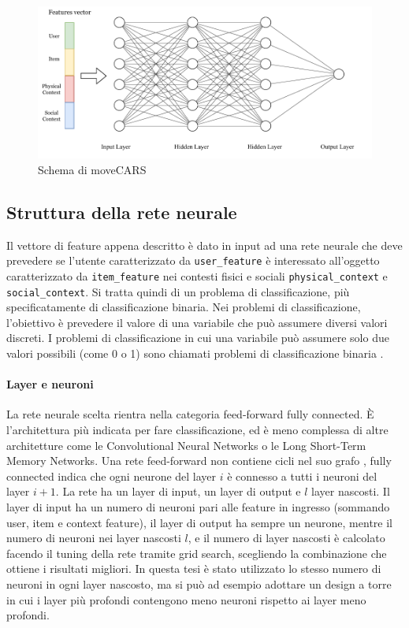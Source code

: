 \documentclass[12pt,italian]{report}
\begin{document}
\begin{figure}
  \includegraphics[width=\linewidth]{immagini/ffnet_schema.pdf}
  \caption{Schema di moveCARS}
  \label{fig:ffnet}
\end{figure}

\subsection{Struttura della rete neurale}
Il vettore di feature appena descritto è dato in input ad una rete neurale che deve prevedere se l'utente caratterizzato da \texttt{user\_feature} è interessato all'oggetto caratterizzato da \texttt{item\_feature} nei contesti fisici e sociali \texttt{physical\_context} e \texttt{social\_context}. Si tratta quindi di un problema di classificazione, più specificatamente di classificazione binaria. Nei problemi di classificazione, l'obiettivo è prevedere il valore di una variabile che può assumere diversi valori discreti. I problemi di classificazione in cui una variabile può assumere solo due valori possibili (come 0 o 1) sono chiamati problemi di classificazione binaria \cite{hands-on-ml}.

\paragraph{Layer e neuroni}
La rete neurale scelta rientra nella categoria feed-forward fully connected. \`E l'architettura più indicata per fare classificazione, ed è meno complessa di altre architetture come le Convolutional Neural Networks o le Long Short-Term Memory Networks. 
Una rete feed-forward non contiene cicli nel suo grafo \cite{Goodfellow-et-al-2016}, fully connected indica che ogni neurone del layer $i$ è connesso a tutti i neuroni del layer $i+1$. La rete ha un layer di input, un layer di output e $l$ layer nascosti. Il layer di input ha un numero di neuroni pari alle feature in ingresso (sommando user, item e context feature), il layer di output ha sempre un neurone, mentre il numero di neuroni nei layer nascosti $l$, e il numero di layer nascosti è calcolato facendo il tuning della rete tramite grid search, scegliendo la combinazione che ottiene i risultati migliori. In questa tesi è stato utilizzato lo stesso numero di neuroni in ogni layer nascosto, ma si può ad esempio adottare un design a torre in cui i layer più profondi contengono meno neuroni rispetto ai layer meno profondi.
\end{document}
